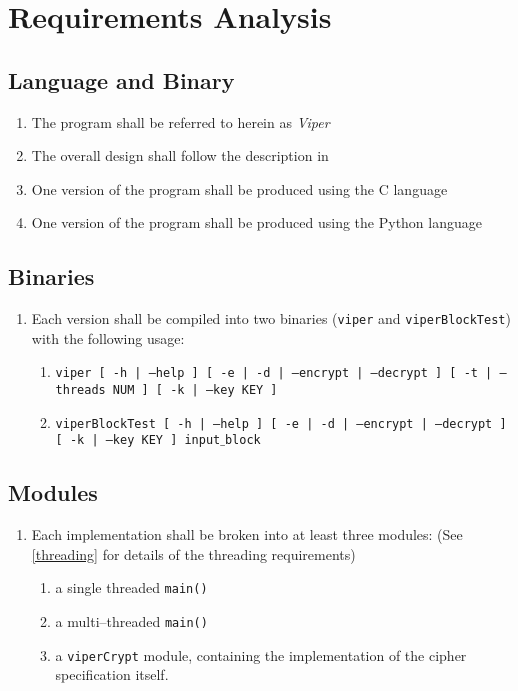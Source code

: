 \section{Requirements Analysis}

\subsection{Language and Binary}
\begin{enumerate}
\item The program shall be referred to herein as \emph{Viper}
\item The overall design shall follow the description in \cite{submission}
\item One version of the program shall be produced using the C language
\item One version of the program shall be produced using the Python language
\end{enumerate}

\subsection{Binaries}
\begin{enumerate}
\item Each version shall be compiled into two binaries (\texttt{viper} and \texttt{viperBlockTest}) with the following usage:
	\begin{enumerate}
	\item \texttt{viper [ -h | --help ]  [ -e | -d | --encrypt | --decrypt ] [ -t | --threads NUM ] [ -k | --key KEY ]}
	\item \texttt{viperBlockTest [ -h | --help ]  [ -e | -d | --encrypt | --decrypt ] [ -k | --key KEY ] input$\_$block}
	\end{enumerate}
\end{enumerate}

\subsection{Modules}
\begin{enumerate}
\item Each implementation shall be broken into at least three modules: (See \ref{threading} for details of the threading requirements)
	\begin{enumerate}
	\item a single threaded \texttt{main()}
	\item a multi--threaded \texttt{main()}
	\item a \texttt{viperCrypt} module, containing the implementation of the cipher specification itself.
	\end{enumerate}
\end{enumerate}

